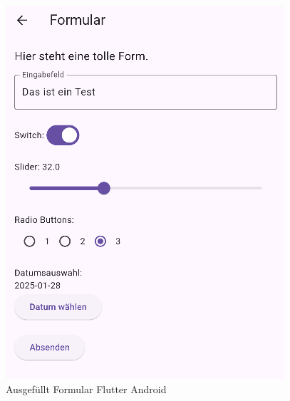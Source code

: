 \begin{figure}[H]
\begin{minipage}{0.45\textwidth}
        \includegraphics[width=\linewidth]{images/form/android/flutter/formCompleted.png}
        \caption{Ausgefüllt Formular Flutter Android}
    \end{minipage}
\end{figure}

